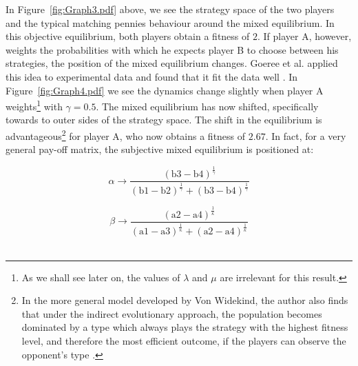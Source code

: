 \documentclass[a4paper,10pt]{article}
\numberwithin{equation}{section}
\begin{document}
In Figure~\ref{fig:Graph3.pdf} above, we see the strategy space of the two players and the typical matching pennies behaviour around the mixed equilibrium. In this objective equilibrium, both players obtain a fitness of $2$. If player A, however, weights the probabilities with which he expects player B to choose between his strategies, the position of the mixed equilibrium changes. Goeree et al. applied this idea to experimental data and found that it fit the data well \cite{Goeree2003}. In Figure~\ref{fig:Graph4.pdf} we see the dynamics change slightly when player A weights\footnote{As we shall see later on, the values of $\lambda$ and $\mu$ are irrelevant for this result.} with $\gamma=0.5$. The mixed equilibrium has now shifted, specifically towards to outer sides of the strategy space. The shift in the equilibrium is advantageous\footnote{In the more general model developed by Von Widekind, the author also finds that under the indirect evolutionary approach, the population becomes dominated by a type which always plays the strategy with the highest fitness level, and therefore the most efficient outcome, if the players can observe the opponent's type \cite{Widekind2008}.} for player A, who now obtains a fitness of $2.67$. In fact, for a very general pay-off matrix, the subjective mixed equilibrium is positioned at:

\begin{equation}
\label{eq:myProspectSolveA}
\alpha \to \frac{(\text{b3}-\text{b4})^{\frac{1}{\gamma }}}{(\text{b1}-\text{b2})^{\frac{1}{\gamma }}+(\text{b3}-\text{b4})^{\frac{1}{\gamma }}}
\end{equation}

\begin{equation}
\label{eq:myProspectSolveB}
\beta \to \frac{(\text{a2}-\text{a4})^{\frac{1}{\kappa }}}{(\text{a1}-\text{a3})^{\frac{1}{\kappa }}+(\text{a2}-\text{a4})^{\frac{1}{\kappa }}}
\end{equation}\\
\end{document}
